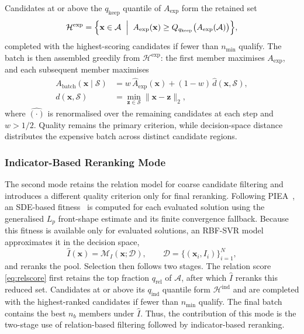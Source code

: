 \documentclass[final,5p,times,twocolumn]{elsarticle}
\newcommand{\vx}{\mathbf{x}}
\newcommand{\vz}{\mathbf{z}}
\begin{document}
Candidates at or above the $q_{\mathrm{keep}}$ quantile of $A_{\mathrm{exp}}$
form the retained set
\begin{equation}
\mathcal{H}^{\mathrm{exp}}=\Bigl\{\vx\in\mathcal{A}\;\Bigm|\;
A_{\mathrm{exp}}(\vx)\geq
Q_{q_{\mathrm{keep}}}\bigl(A_{\mathrm{exp}}(\mathcal{A})\bigr)\Bigr\},
\label{eq:prefilter-exp}
\end{equation}
completed with the highest-scoring candidates if fewer than $n_{\min}$ qualify.
The batch is then assembled greedily from $\mathcal{H}^{\mathrm{exp}}$: the
first member maximises $A_{\mathrm{exp}}$, and each subsequent member maximises
\begin{equation}
\begin{split}
A_{\mathrm{batch}}(\vx\mid\mathcal{S})
&=w\,\widehat A_{\mathrm{exp}}(\vx)
+(1-w)\,\widehat d(\vx,\mathcal{S}),\\
d(\vx,\mathcal{S})&=\min_{\vz\in\mathcal{S}}\|\vx-\vz\|_2,
\end{split}
\label{eq:greedy}
\end{equation}
where $\widehat{(\cdot)}$ is renormalised over the remaining candidates at each
step and $w>1/2$. Quality remains the primary criterion, while decision-space
distance distributes the expensive batch across distinct candidate regions.

\subsubsection{Indicator-Based Reranking Mode}
\label{sec:method:candidate:ind}

The second mode retains the relation model for coarse candidate filtering and
introduces a different quality criterion only for final reranking. Following
PIEA~\cite{ref:piea}, an SDE-based fitness~\cite{ref:sde} is computed for each
evaluated solution using the generalised $L_p$ front-shape estimate and its
finite convergence fallback. Because this fitness is available only for
evaluated solutions, an RBF-SVR model approximates it in the decision space,
\begin{equation}
\widehat I(\vx)=\mathcal{M}_I(\vx;\mathcal{D}),
\qquad
\mathcal{D}=\{(\vx_i,I_i)\}_{i=1}^{N},
\label{eq:svr}
\end{equation}
and reranks the pool. Selection then follows two stages. The relation score
\eqref{eq:relscore} first retains the top fraction $q_{\mathrm{rel}}$ of
$\mathcal{A}$, after which $\widehat I$ reranks this reduced set. Candidates at
or above its $q_{\mathrm{ind}}$ quantile form $\mathcal{H}^{\mathrm{ind}}$ and
are completed with the highest-ranked candidates if fewer than $n_{\min}$
qualify. The final batch contains the best $n_b$ members under $\widehat I$.
Thus, the contribution of this mode is the two-stage use of relation-based
filtering followed by indicator-based reranking.
\end{document}
